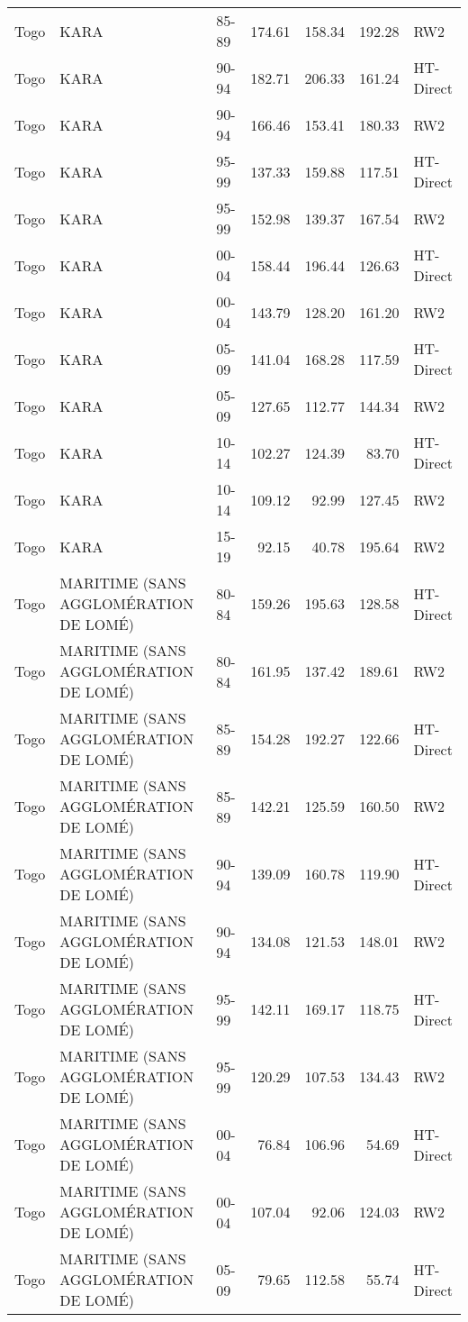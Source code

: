 \begin{longtable}{lllrrrl}
  Togo & KARA & 85-89 & 174.61 & 158.34 & 192.28 & RW2 \\ 
  Togo & KARA & 90-94 & 182.71 & 206.33 & 161.24 & HT-Direct \\ 
  Togo & KARA & 90-94 & 166.46 & 153.41 & 180.33 & RW2 \\ 
  Togo & KARA & 95-99 & 137.33 & 159.88 & 117.51 & HT-Direct \\ 
  Togo & KARA & 95-99 & 152.98 & 139.37 & 167.54 & RW2 \\ 
  Togo & KARA & 00-04 & 158.44 & 196.44 & 126.63 & HT-Direct \\ 
  Togo & KARA & 00-04 & 143.79 & 128.20 & 161.20 & RW2 \\ 
  Togo & KARA & 05-09 & 141.04 & 168.28 & 117.59 & HT-Direct \\ 
  Togo & KARA & 05-09 & 127.65 & 112.77 & 144.34 & RW2 \\ 
  Togo & KARA & 10-14 & 102.27 & 124.39 & 83.70 & HT-Direct \\ 
  Togo & KARA & 10-14 & 109.12 & 92.99 & 127.45 & RW2 \\ 
  Togo & KARA & 15-19 & 92.15 & 40.78 & 195.64 & RW2 \\ 
  Togo & MARITIME (SANS AGGLOMÉRATION DE LOMÉ) & 80-84 & 159.26 & 195.63 & 128.58 & HT-Direct \\ 
  Togo & MARITIME (SANS AGGLOMÉRATION DE LOMÉ) & 80-84 & 161.95 & 137.42 & 189.61 & RW2 \\ 
  Togo & MARITIME (SANS AGGLOMÉRATION DE LOMÉ) & 85-89 & 154.28 & 192.27 & 122.66 & HT-Direct \\ 
  Togo & MARITIME (SANS AGGLOMÉRATION DE LOMÉ) & 85-89 & 142.21 & 125.59 & 160.50 & RW2 \\ 
  Togo & MARITIME (SANS AGGLOMÉRATION DE LOMÉ) & 90-94 & 139.09 & 160.78 & 119.90 & HT-Direct \\ 
  Togo & MARITIME (SANS AGGLOMÉRATION DE LOMÉ) & 90-94 & 134.08 & 121.53 & 148.01 & RW2 \\ 
  Togo & MARITIME (SANS AGGLOMÉRATION DE LOMÉ) & 95-99 & 142.11 & 169.17 & 118.75 & HT-Direct \\ 
  Togo & MARITIME (SANS AGGLOMÉRATION DE LOMÉ) & 95-99 & 120.29 & 107.53 & 134.43 & RW2 \\ 
  Togo & MARITIME (SANS AGGLOMÉRATION DE LOMÉ) & 00-04 & 76.84 & 106.96 & 54.69 & HT-Direct \\ 
  Togo & MARITIME (SANS AGGLOMÉRATION DE LOMÉ) & 00-04 & 107.04 & 92.06 & 124.03 & RW2 \\ 
  Togo & MARITIME (SANS AGGLOMÉRATION DE LOMÉ) & 05-09 & 79.65 & 112.58 & 55.74 & HT-Direct \\ 

\end{longtable}
